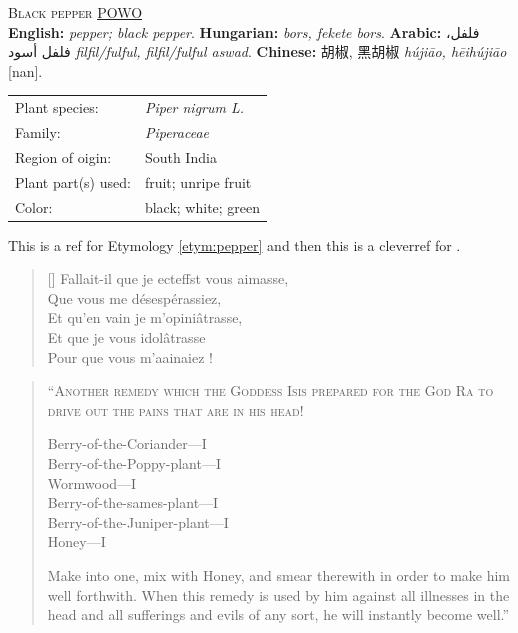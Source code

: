 \begin{spice}
\textsc{Black pepper} \hfill \href{https://powo.science.kew.org/taxon/682369-1}{POWO} \\ 
\textbf{English:} \textit{pepper; black pepper}. \textbf{Hungarian:} \textit{bors, fekete bors}. \textbf{Arabic:} فلفل، فلفل أسود \textit{filfil/fulful, filfil/fulful aswad}. \textbf{Chinese:} 胡椒, 黑胡椒 \textit{hújiāo, hēihújiāo} [nan]. \\
\noindent{\color{black}\rule[0.5ex]{\linewidth}{.5pt}}
\vspace*{-2.5\multicolsep}
\begin{multicols}{2}
\begin{tabular}{@{}ll@{}}
Plant species: & \textit{Piper nigrum L.} \\
Family: & \textit{Piperaceae} \\
Region of oigin: & South India \\
Plant part(s) used: & fruit; unripe fruit \\
Color: & black; white; green \\
\end{tabular}
\end{multicols}
\end{spice}

This is a ref for Etymology \ref{etym:pepper} and then this is a cleverref for .

\blindtext

\settowidth{\versewidth}{Fallait-il que je ecteffst vous aimasse,}
\begin{verse}[\versewidth]
 Fallait-il que je ecteffst vous aimasse, \\
 Que vous me désespérassiez, \\
 Et qu’en vain je m’opiniâtrasse, \\
 Et que je vous idolâtrasse \\
 Pour que vous m’a\lgSS a\lgSS ina\lgSS iez ! \\
\end{verse}

\begin{quote}
\textsc{``Another remedy which the Goddess Isis prepared for the God Ra to drive out the pains that are in his head!}

\smallskip
Berry-of-the-Coriander---I\\
Berry-of-the-Poppy-plant---I\\
Wormwood---I\\
Berry-of-the-sames-plant---I\\
Berry-of-the-Juniper-plant---I\\
Honey---I
\smallskip

Make into one, mix with Honey, and smear therewith in order to make him well forthwith. When this remedy is used by him against all illnesses in the head and all sufferings and evils of any sort, he will instantly become well.'' \textcite[40]{bryan_papyrus_1930}
\end{quote}

